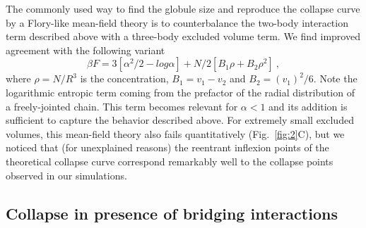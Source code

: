\documentclass[a4paper,12pt,pre,superscriptaddress]{revtex4}
\begin{document}
% 
The commonly used way to find the globule size and reproduce the
collapse curve by a Flory-like mean-field theory is to counterbalance
the two-body interaction term described above with a three-body
excluded volume term. We find improved agreement with the following
variant~\cite{DeGennes1975}
  \begin{equation}
    \beta F = 3 [\alpha^2/2 - log \alpha] + N/2 [B_1 \rho  + B_2 \rho^2 ] \ ,
    \label{eq:deg_mfield}
\end{equation}
where $\rho = N/R^3$ is the concentration, $B_1 = v_1 - v_2$ and $B_2
= (v_1)^2 / 6$. Note the logarithmic entropic term
coming from the prefactor of the radial distribution of a
freely-jointed chain.
%
%
This term becomes relevant for $\alpha < 1$ and its
addition is sufficient to capture the behavior described above.  For
extremely small excluded volumes, this mean-field theory also fails
quantitatively (Fig.~\ref{fig:2}C), but we noticed that (for
unexplained reasons) the reentrant inflexion points of the theoretical
collapse curve correspond remarkably well to the collapse points
observed in our simulations.



%
%
%


\subsection*{Collapse in presence of bridging interactions}
\end{document}
